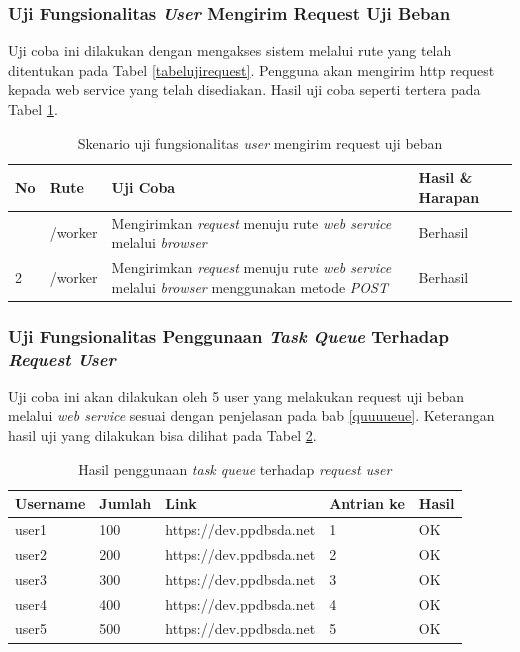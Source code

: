 			\subsubsection{Uji Fungsionalitas \textit{User} Mengirim Request Uji Beban}
				Uji coba ini dilakukan dengan mengakses sistem melalui rute yang telah ditentukan pada Tabel \ref{tabelujirequest}. Pengguna akan mengirim http request kepada web service yang telah
				disediakan. Hasil uji coba seperti tertera pada Tabel \ref{tabelhasilujirequest}.
				\begin{longtable}{|p{}|p{}|p{0.30\textwidth}|p{}|}
					\caption{Skenario uji fungsionalitas \textit{user} mengirim request uji beban} \label{tabelhasilujirequest} \\ \hline
					\textbf{No} & \textbf{Rute} & \textbf{Uji Coba} & \textbf{Hasil \& Harapan} \\ \hline
					\endhead
					\endfoot
					\endlastfoot
					1 & /worker & Mengirimkan \textit{request} menuju rute \textit{web service} melalui \textit{browser} & Berhasil \\ \hline
					2 & /worker & Mengirimkan \textit{request} menuju rute \textit{web service} melalui \textit{browser} menggunakan metode \textit{POST} & Berhasil \\ \hline
				\end{longtable}
				
			\subsubsection{Uji Fungsionalitas Penggunaan \textit{Task Queue} Terhadap \textit{Request User}}
				Uji coba ini akan dilakukan oleh 5 user yang melakukan request uji beban melalui \textit{web service} sesuai dengan penjelasan pada bab \ref{quuuueue}. Keterangan hasil uji yang dilakukan bisa dilihat pada Tabel \ref{quuuuueee}.
				\begin{longtable}{|p{}|p{}|p{}|p{}|p{}|}
					\caption{Hasil penggunaan \textit{task queue} terhadap \textit{request user}} \label{quuuuueee} \\
					\hline
					\textbf{Username} & \textbf{Jumlah} & \textbf{Link} & \textbf{Antrian ke} & \textbf{Hasil} \\ \hline
					\endhead
					\endfoot
					\endlastfoot
					user1 & 100 & https://dev.ppdbsda.net & 1 & OK \\ \hline
					user2 & 200 & https://dev.ppdbsda.net & 2 & OK \\ \hline
					user3 & 300 & https://dev.ppdbsda.net & 3 & OK \\ \hline
					user4 & 400 & https://dev.ppdbsda.net & 4 & OK \\ \hline
					user5 & 500 & https://dev.ppdbsda.net & 5 & OK \\ \hline
				\end{longtable}
				
